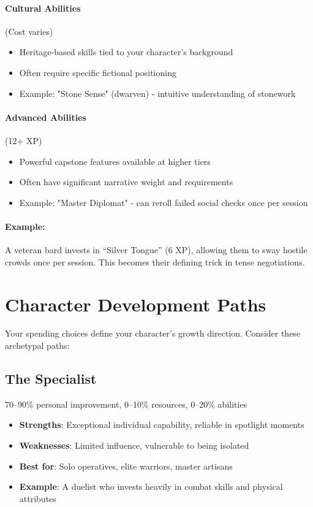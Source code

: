 \begin{multicols}{2}
\paragraph{Cultural Abilities} (Cost varies) 
\begin{itemize}
\item Heritage-based skills tied to your character's background
\item Often require specific fictional positioning
\item Example: "Stone Sense" (dwarven) - intuitive understanding of stonework
\end{itemize}

\paragraph{Advanced Abilities} (12+ XP) 
\begin{itemize}
\item Powerful capstone features available at higher tiers
\item Often have significant narrative weight and requirements
\item Example: "Master Diplomat" - can reroll failed social checks once per session
\end{itemize}

\paragraph{Example:}  
A veteran bard invests in “Silver Tongue” (6 XP), allowing them to sway hostile crowds once per session. This becomes their defining trick in tense negotiations.

\section{Character Development Paths}

Your spending choices define your character's growth direction. Consider these archetypal paths:

\subsection*{The Specialist}
70–90\% personal improvement, 0–10\% resources, 0–20\% abilities
\begin{itemize}
\item \textbf{Strengths}: Exceptional individual capability, reliable in spotlight moments
\item \textbf{Weaknesses}: Limited influence, vulnerable to being isolated
\item \textbf{Best for}: Solo operatives, elite warriors, master artisans
\item \textbf{Example}: A duelist who invests heavily in combat skills and physical attributes
\end{itemize}


\end{multicols}
